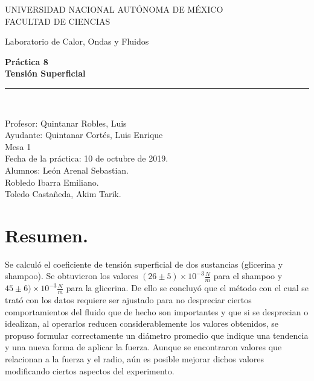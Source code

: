 \documentclass[a4paper]{article}
\begin{document}
\begin{titlepage}
\begin{center}
\begin{figure}
\end{figure}
\vspace*{0.5in}
UNIVERSIDAD NACIONAL AUTÓNOMA DE MÉXICO\\
\vspace*{0.2in}
FACULTAD DE CIENCIAS \\
\vspace*{0.5in}
\begin{large}
Laboratorio de Calor, Ondas y Fluidos\\
\end{large}
\vspace*{0.2in}
\begin{Large}
\textbf{Práctica 8} \\
\textbf{Tensión Superficial} \\
\end{Large}
\vspace*{0.3in}
\vspace*{0.3in}
\rule{80mm}{0.1mm}\\
\vspace*{0.1in}
\begin{large}
Profesor:  Quintanar Robles, Luis  \\
Ayudante: Quintanar Cortés, Luis Enrique \\
Mesa 1\\
Fecha de la práctica: 10 de octubre de 2019.\\
Alumnos: León Arenal Sebastian.\\
Robledo Ibarra Emiliano. \\
Toledo Castañeda, Akim Tarik.\\

\end{large}
\end{center}
\end{titlepage}

\section*{Resumen.}
Se calculó el coeficiente de tensión superficial de dos sustancias (glicerina y shampoo). Se obtuvieron los valores $(26\pm 5)\times10^{-3}  \frac{N}{m}$ para el shampoo y $45\pm 6)\times10^{-3}  \frac{N}{m}$ para la glicerina. De ello se concluyó que el método con el cual se trató con los datos requiere ser ajustado para no despreciar ciertos comportamientos del fluido que de hecho son importantes y que si se desprecian o idealizan, al operarlos reducen considerablemente los valores obtenidos, se propuso  formular correctamente un diámetro promedio que indique una tendencia y una nueva forma de aplicar la fuerza. Aunque se encontraron valores que relacionan a la fuerza y el radio, aún es posible mejorar dichos valores modificando ciertos aspectos del experimento.
\end{document}
